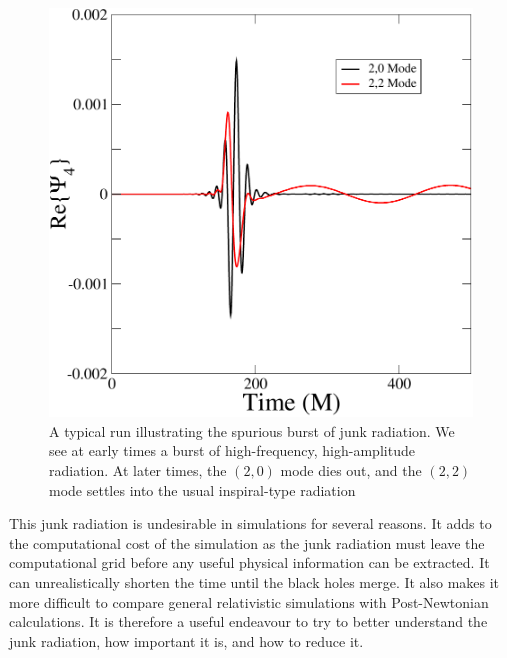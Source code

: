 \begin{figure}
 \includegraphics[scale=0.95]{chap5/Typical}
  \caption[A typical run illustrating junk radation.]{A typical run illustrating the spurious burst of junk radiation. We see at early times a burst of high-frequency, high-amplitude radiation. At later times, the $(2,0)$ mode dies out, and the $(2,2)$ mode settles into the usual inspiral-type radiation}
  \label{fig:Typical}
\end{figure}


This junk radiation is undesirable in simulations for several
reasons. It adds to the computational cost of the simulation as the
junk radiation must leave the computational grid before any useful
physical information can be extracted.  It can unrealistically shorten
the time until the black holes
merge\cite{BodeEtAl:2008}. It also makes it more difficult
to compare general relativistic simulations with Post-Newtonian
calculations. It is therefore a useful endeavour to try to better
understand the junk radiation, how important it is, and how to reduce
it.

